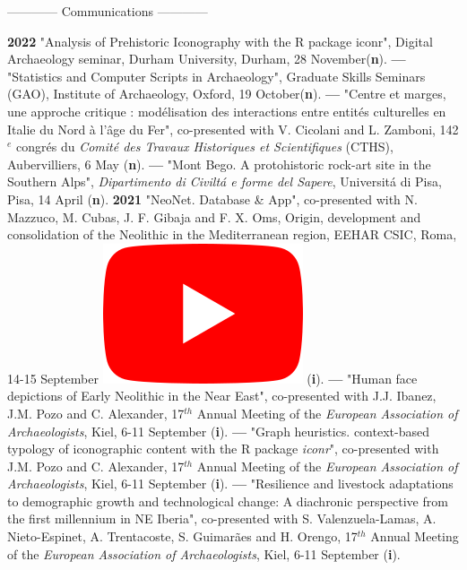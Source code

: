 \documentclass{article}
\begin{document}
\begin{center}------------ Communications ------------\end{center}
\smallbreak
\textbf{2022 }"Analysis of Prehistoric Iconography with the R package iconr", Digital Archaeology seminar, Durham University, Durham, 28 November(\textbf{n}).
\smallbreak
\textbf{--- }"Statistics and Computer Scripts in Archaeology", Graduate Skills Seminars (GAO), Institute of Archaeology, Oxford, 19 October(\textbf{n}).
\smallbreak
\textbf{--- }"Centre et marges, une approche critique : modélisation des interactions entre entités culturelles en Italie du Nord à l'âge du Fer", co-presented with V. Cicolani and L. Zamboni, 142${}^{e}$ congr\'{e}s du \textit{Comit\'{e} des Travaux Historiques et Scientifiques} (CTHS), Aubervilliers, 6 May (\textbf{n}).
\smallbreak
\textbf{--- }"Mont Bego. A protohistoric rock-art site in the Southern Alps", \textit{Dipartimento di Civilt\'{a} e forme del Sapere}, Universit\'{a} di Pisa, Pisa, 14 April (\textbf{n}).
\smallbreak
\textbf{2021 }"NeoNet. Database \& App", co-presented with N. Mazzuco, M. Cubas, J. F. Gibaja and F. X. Oms, Origin, development and consolidation of the Neolithic in the Mediterranean region, EEHAR CSIC, Roma, 14-15 September \href{https://youtu.be/GM2niot0XwE?t=10700}{\includegraphics[scale=0.2]{icon_youtube}} (\textbf{i}).
\smallbreak
\textbf{--- }"Human face depictions of Early Neolithic in the Near East", co-presented with J.J. Ibanez, J.M. Pozo and C. Alexander, 17${}^{th}$ Annual Meeting of the \textit{European Association of Archaeologists}, Kiel, 6-11 September (\textbf{i}).
\smallbreak
\textbf{--- }"Graph heuristics. context-based typology of iconographic content with the R package \textit{iconr}", co-presented with J.M. Pozo and C. Alexander, 17${}^{th}$ Annual Meeting of the \textit{European Association of Archaeologists}, Kiel, 6-11 September (\textbf{i}).
\smallbreak
\textbf{--- }"Resilience and livestock adaptations to demographic growth and technological change: A diachronic perspective from the first millennium in NE Iberia", co-presented with S. Valenzuela-Lamas, A. Nieto-Espinet, A. Trentacoste, S. Guimarães and H. Orengo, 17${}^{th}$ Annual Meeting of the \textit{European Association of Archaeologists}, Kiel, 6-11 September (\textbf{i}).
\end{document}
